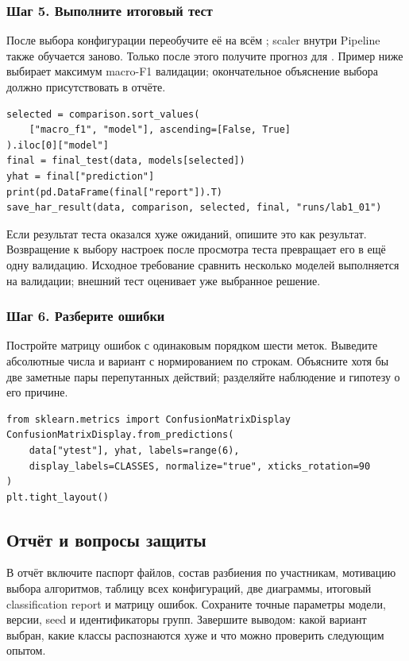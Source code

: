 \subsubsection*{Шаг 5. Выполните итоговый тест}
После выбора конфигурации переобучите её на всём ; scaler внутри Pipeline также обучается заново. Только после этого получите прогноз  для . Пример ниже выбирает максимум macro-F1 валидации; окончательное объяснение выбора должно присутствовать в отчёте.
\begin{lstlisting}
selected = comparison.sort_values(
    ["macro_f1", "model"], ascending=[False, True]
).iloc[0]["model"]
final = final_test(data, models[selected])
yhat = final["prediction"]
print(pd.DataFrame(final["report"]).T)
save_har_result(data, comparison, selected, final, "runs/lab1_01")
\end{lstlisting}
Если результат теста оказался хуже ожиданий, опишите это как результат. Возвращение к выбору настроек после просмотра теста превращает его в ещё одну валидацию. Исходное требование сравнить несколько моделей выполняется на валидации; внешний тест оценивает уже выбранное решение.

\subsubsection*{Шаг 6. Разберите ошибки}
Постройте матрицу ошибок с одинаковым порядком шести меток. Выведите абсолютные числа и вариант с нормированием по строкам. Объясните хотя бы две заметные пары перепутанных действий; разделяйте наблюдение и гипотезу о его причине.
\begin{lstlisting}
from sklearn.metrics import ConfusionMatrixDisplay
ConfusionMatrixDisplay.from_predictions(
    data["ytest"], yhat, labels=range(6),
    display_labels=CLASSES, normalize="true", xticks_rotation=90
)
plt.tight_layout()
\end{lstlisting}

\subsection{Отчёт и вопросы защиты}
В отчёт включите паспорт файлов, состав разбиения по участникам, мотивацию выбора алгоритмов, таблицу всех конфигураций, две диаграммы, итоговый classification report и матрицу ошибок. Сохраните точные параметры модели, версии, seed и идентификаторы групп. Завершите выводом: какой вариант выбран, какие классы распознаются хуже и что можно проверить следующим опытом.

